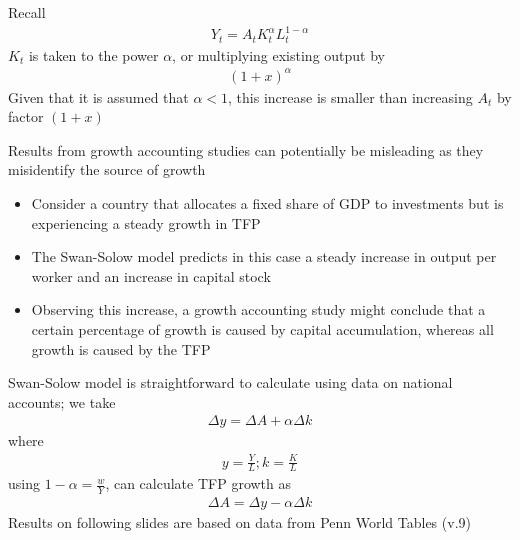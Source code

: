 \documentclass{beamer}
\begin{document}
\begin{frame}
 Recall
 \begin{align*}
   Y_t=A_tK_t^{\alpha}L_t^{1-\alpha}
 \end{align*}
 $K_t$ is taken to the power $\alpha$, or multiplying existing output by
 \begin{align}
   (1+x)^{\alpha}
 \end{align}
 \medskip
 Given that it is assumed that $\alpha<1$, this increase is smaller than increasing $A_t$ by factor $(1+x)$  
\end{frame}



\begin{frame}
 Results from growth accounting studies can potentially be misleading as they misidentify the source of growth
 \begin{itemize}
   \item Consider a country that allocates a fixed share of GDP to investments but is experiencing a steady growth in TFP
   \item The Swan-Solow model predicts in this case a steady increase in output per worker and an increase in capital stock
   \item Observing this increase, a growth accounting study might conclude that a certain percentage of growth is caused by capital accumulation, whereas all growth is caused by the TFP
 \end{itemize}
\end{frame}

\begin{frame}
  Swan-Solow model is straightforward to calculate using data on national accounts; we take
  \begin{align}
    \Delta y= \Delta A + \alpha \Delta k
  \end{align}
  where
  \begin{align}
  y=\frac{Y}{L}; k=\frac{K}{L}
  \end{align}
  using $1-\alpha=\frac{w}{Y}$, can calculate TFP growth as
  \begin{align}
    \Delta A = \Delta y - \alpha \Delta k
  \end{align}
  \medskip
  Results on following slides are based on data from Penn World Tables (v.9)
\end{frame}
\end{document}
